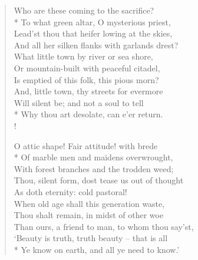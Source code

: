 \begin{verse}
Who are these coming to the sacrifice?\\*
\vin To what green altar, O mysterious priest,\\
Lead'st thou that heifer lowing at the skies,\\
\vin And all her silken flanks with garlands drest?\\
What little town by river or sea shore,\\
\vin Or mountain-built with peaceful citadel,\\
\vin \vin Is emptied of this folk, this pious morn?\\
And, little town, thy streets for evermore\\
\vin Will silent be; and not a soul to tell\\*
\vin \vin Why thou art desolate, can e'er return.\\!

O attic shape! Fair attitude! with brede\\*
\vin Of marble men and maidens overwrought,\\
With forest branches and the trodden weed;\\
\vin Thou, silent form, dost tease us out of thought\\
As doth eternity: cold pastoral!\\
\vin When old age shall this generation waste,\\
\vin \vin Thou shalt remain, in midst of other woe\\
Than ours, a friend to man, to whom thou say'st,\\
\vin `Beauty is truth, truth beauty -- that is all\\*
\vin \vin Ye know on earth, and all ye need to know.'
\end{verse}
